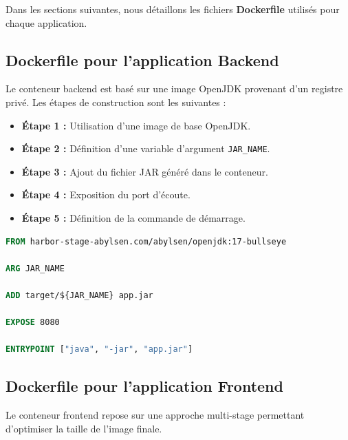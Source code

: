 Dans les sections suivantes, nous détaillons les fichiers \textbf{Dockerfile} utilisés pour chaque application.
\subsection*{Dockerfile pour l'application Backend}

Le conteneur backend est basé sur une image OpenJDK provenant d’un registre privé. Les étapes de construction sont les suivantes :

\begin{itemize}
    \item \textbf{Étape 1 :} Utilisation d'une image de base OpenJDK.
    \item \textbf{Étape 2 :} Définition d'une variable d'argument \texttt{JAR\_NAME}.
    \item \textbf{Étape 3 :} Ajout du fichier JAR généré dans le conteneur.
    \item \textbf{Étape 4 :} Exposition du port d'écoute.
    \item \textbf{Étape 5 :} Définition de la commande de démarrage.
\end{itemize}

\begin{lstlisting}[language=Dockerfile, caption=Dockerfile du Backend]
FROM harbor-stage-abylsen.com/abylsen/openjdk:17-bullseye

ARG JAR_NAME

ADD target/${JAR_NAME} app.jar

EXPOSE 8080

ENTRYPOINT ["java", "-jar", "app.jar"]
\end{lstlisting}

\subsection*{Dockerfile pour l'application Frontend}

Le conteneur frontend repose sur une approche multi-stage permettant d’optimiser la taille de l’image finale.


